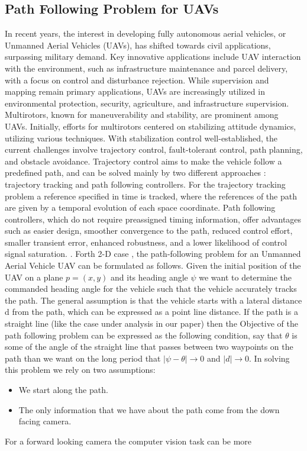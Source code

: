 \subsection{Path Following Problem for UAVs}
In recent years, the interest in developing fully autonomous aerial vehicles, or Unmanned Aerial Vehicles (UAVs), has shifted towards civil applications, surpassing military demand. Key innovative applications include UAV interaction with the environment, such as infrastructure maintenance and parcel delivery, with a focus on control and disturbance rejection. While supervision and mapping remain primary applications, UAVs are increasingly utilized in environmental protection, security, agriculture, and infrastructure supervision. Multirotors, known for maneuverability and stability, are prominent among UAVs. Initially, efforts for multirotors centered on stabilizing attitude dynamics, utilizing various techniques. With stabilization control well-established, the current challenges involve trajectory control, fault-tolerant control, path planning, and obstacle avoidance. Trajectory control aims to make the vehicle follow a predefined path, and can  be solved mainly by two different approaches : trajectory tracking and path following controllers.  For the trajectory tracking problem a reference specified in time is tracked, where the references of the path are given by a temporal evolution of each space coordinate. Path following controllers, which do not require preassigned timing information, offer advantages such as easier design, smoother convergence to the path, reduced control effort, smaller transient error, enhanced robustness, and a lower likelihood of control signal saturation. \cite{} \cite{}.
Forth 2-D case , the path-following problem for an  Unmanned Aerial Vehicle UAV can be formulated as follows.
Given the initial position of the UAV on a plane $p=(x,y)$ and its heading angle $\psi$ we want to determine the commanded heading angle for the vehicle such that the vehicle accurately tracks the path. The general assumption is that the vehicle starts with a lateral distance d from the path, which can be expressed as a point line distance. If the path is a straight line (like the case under analysis in our paper) then the Objective of the path following problem can be expressed as the following condition, say that $\theta$ is some of the angle of the straight line that passes between two waypoints on the path than we want on the long period that $|\psi-\theta|\rightarrow0$ and $|d|\rightarrow0$.  In solving this problem  we rely on two assumptions:
\begin{itemize}
    \item We start along the path.
    \item The only information that we have about the path come from the down facing camera.
\end{itemize}
For a forward looking camera the computer vision task can be more 
